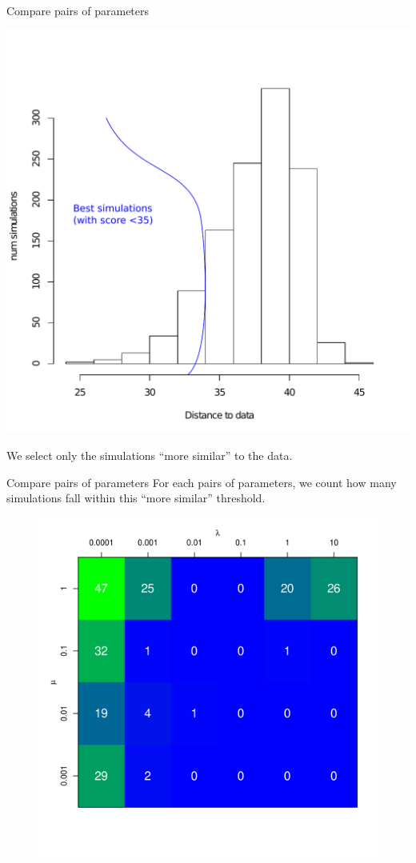 \documentclass[12pt, notes=show]{beamer}
\begin{document}
\begin{frame}{Compare pairs of parameters}

    \begin{center}
	\includegraphics[width=.65\textwidth]{images/histScoreBest.pdf}\\
    \end{center}
    We select only the simulations ``more similar'' to the data.
\end{frame}

\begin{frame}{Compare pairs of parameters}
    For each pairs of parameters, we count how many simulations fall within this ``more similar'' threshold.
    \begin{figure}
	\includegraphics[width=.4\textwidth]{images/heatmapSimu}\\
	\centering
    \end{figure}

\end{frame}
\end{document}
